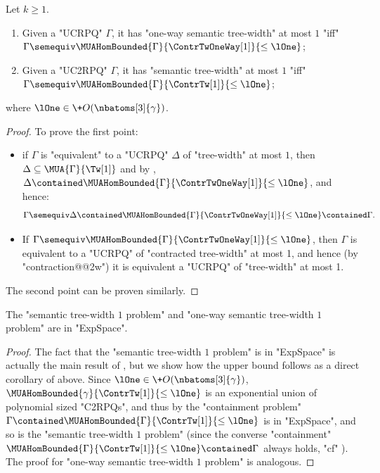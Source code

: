 \begin{lemma}
	\AP\label{lemma:characterisation-bounded-semantic-tw}
	Let $k \geq 1$.
	\begin{enumerate}
		\item Given a "UCRPQ" $\Gamma$, it has "one-way semantic tree-width" at most $1$
			"iff" $\Gamma \semequiv \MUAHomBounded{\Gamma}{\ContrTwOneWay[1]}{\leq\lOne}$;
		\item Given a "UC2RPQ" $\Gamma$, it has "semantic tree-width" at most $1$
			"iff" $\Gamma \semequiv \MUAHomBounded{\Gamma}{\ContrTw[1]}{\leq\lOne}$;
	\end{enumerate}
	where $\lOne \in \+O(\nbatoms[3]{\gamma})$.
\end{lemma}
\begin{proof}
	To prove the first point:
	\begin{itemize}
		\item if $\Gamma$ is "equivalent" to a "UCRPQ" $\Delta$ of "tree-width" at most $1$, then
			$\Delta \subseteq \MUA{\Gamma}{\Tw[1]}$ and by ,
			$\Delta \contained \MUAHomBounded{\Gamma}{\ContrTwOneWay[1]}{\leq\lOne}$,
			and hence:
			\[
				\Gamma \semequiv \Delta
				\contained \MUAHomBounded{\Gamma}{\ContrTwOneWay[1]}{\leq\lOne}
				\contained \Gamma.
			\]
		\item If $\Gamma \semequiv \MUAHomBounded{\Gamma}{\ContrTwOneWay[1]}{\leq\lOne}$, 
			then $\Gamma$ is equivalent to a "UCRPQ" of "contracted tree-width" at
			most 1, and hence (by "contraction@@2w") it is equivalent a "UCRPQ" of "tree-width" at most 1. 
	\end{itemize}
	The second point can be proven similarly.
\end{proof}
\begin{corollary}[Upper bound of \Cref{thm:decidability-semtw} for $k=1$]
	\AP\label{cor:sem-tw-1-pb-exp-c}
	The "semantic tree-width $1$ problem" and "one-way semantic tree-width $1$ problem" are in "ExpSpace".
\end{corollary}
\begin{proof}
	The fact that the "semantic tree-width $1$ problem" is in "ExpSpace" is actually the main result of \cite[Theorem~6.1]{BarceloRomeroVardi2016SemanticAcyclicity}, but we show how the upper bound follows as a direct corollary of  above.
	Since $\lOne \in \+O(\nbatoms[3]{\gamma})$,
	$\MUAHomBounded{\gamma}{\ContrTw[1]}{\leq\lOne}$ is an exponential union of polynomial sized "C2RPQs", and thus by  the "containment problem" $\Gamma \contained \MUAHomBounded{\Gamma}{\ContrTw[1]}{\leq\lOne}$ is in "ExpSpace", and so is the "semantic tree-width $1$ problem" (since the converse "containment" $\MUAHomBounded{\Gamma}{\ContrTw[1]}{\leq\lOne} \contained \Gamma$ always holds, "cf" ).
	The proof for "one-way semantic tree-width $1$ problem" is analogous.
\end{proof}

